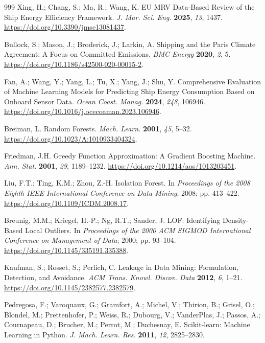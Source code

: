 \documentclass[preprints,article,submit,pdftex,oneauthor]{Definitions/mdpi}
\begin{document}
\begin{thebibliography}{999}
Xing, H.; Chang, S.; Ma, R.; Wang, K. EU MRV Data-Based Review of the Ship Energy Efficiency Framework. \textit{J. Mar. Sci. Eng.} \textbf{2025}, \textit{13}, 1437. \url{https://doi.org/10.3390/jmse13081437}.

Bullock, S.; Mason, J.; Broderick, J.; Larkin, A. Shipping and the Paris Climate Agreement: A Focus on Committed Emissions. \textit{BMC Energy} \textbf{2020}, \textit{2}, 5. \url{https://doi.org/10.1186/s42500-020-00015-2}.

Fan, A.; Wang, Y.; Yang, L.; Tu, X.; Yang, J.; Shu, Y. Comprehensive Evaluation of Machine Learning Models for Predicting Ship Energy Consumption Based on Onboard Sensor Data. \textit{Ocean Coast. Manag.} \textbf{2024}, \textit{248}, 106946. \url{https://doi.org/10.1016/j.ocecoaman.2023.106946}.

Breiman, L. Random Forests. \textit{Mach. Learn.} \textbf{2001}, \textit{45}, 5--32. \url{https://doi.org/10.1023/A:1010933404324}.

Friedman, J.H. Greedy Function Approximation: A Gradient Boosting Machine. \textit{Ann. Stat.} \textbf{2001}, \textit{29}, 1189--1232. \url{https://doi.org/10.1214/aos/1013203451}.

Liu, F.T.; Ting, K.M.; Zhou, Z.-H. Isolation Forest. In \textit{Proceedings of the 2008 Eighth IEEE International Conference on Data Mining}; 2008; pp. 413--422. \url{https://doi.org/10.1109/ICDM.2008.17}.

Breunig, M.M.; Kriegel, H.-P.; Ng, R.T.; Sander, J. LOF: Identifying Density-Based Local Outliers. In \textit{Proceedings of the 2000 ACM SIGMOD International Conference on Management of Data}; 2000; pp. 93--104. \url{https://doi.org/10.1145/335191.335388}.

Kaufman, S.; Rosset, S.; Perlich, C. Leakage in Data Mining: Formulation, Detection, and Avoidance. \textit{ACM Trans. Knowl. Discov. Data} \textbf{2012}, \textit{6}, 1--21. \url{https://doi.org/10.1145/2382577.2382579}.

Pedregosa, F.; Varoquaux, G.; Gramfort, A.; Michel, V.; Thirion, B.; Grisel, O.; Blondel, M.; Prettenhofer, P.; Weiss, R.; Dubourg, V.; VanderPlas, J.; Passos, A.; Cournapeau, D.; Brucher, M.; Perrot, M.; Duchesnay, E. Scikit-learn: Machine Learning in Python. \textit{J. Mach. Learn. Res.} \textbf{2011}, \textit{12}, 2825--2830.

\end{thebibliography}
\end{document}
